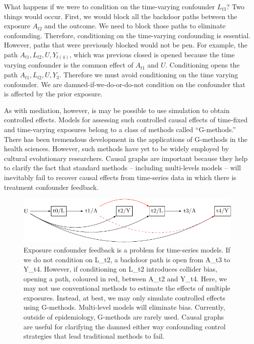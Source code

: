 \documentclass[
  singlecolumn]{report}
\begin{document}
What happens if we were to condition on the time-varying confounder
\(L_{t3}\)? Two things would occur. First, we would block all the
backdoor paths between the exposure \(A_{t2}\) and the outcome. We need
to block those paths to eliminate confounding. Therefore, conditioning
on the time-varying confounding is essential. However, paths that were
previously blocked would not be pen. For example, the path
\(A_{t1}, L_{t2}, U, Y_{t(4)}\), which was previous closed is opened
because the time varying confounder is the common effect of \(A_{t1}\)
and \(U\). Conditioning opens the path \(A_{t1}, L_{t2}, U, Y_{3}\).
Therefore we must avoid conditioning on the time varying confounder. We
are damned-if-we-do-or-do-not condition on the confounder that is
affected by the prior exposure.

As with mediation, however, is may be possible to use simulation to
obtain controlled effects. Models for assessing such controlled causal
effects of time-fixed and time-varying exposures belong to a class of
methods called ``G-methods.'' There has been tremendous development in
the applications of G-methods in the health sciences. However, such
methods have yet to be widely employed by cultural evolutionary
researchers. Causal graphs are important because they help to clarify
the fact that standard methods -- including multi-levels models -- will
inevitably fail to recover causal effects from time-series data in which
there is treatment confounder feedback.

\begin{figure}

{\centering \includegraphics[width=1\textwidth,height=\textheight]{causal-dags_files/figure-pdf/fig-dag-9-1.pdf}

}

\caption{\label{fig-dag-9}Exposure confounder feedback is a problem for
time-series models. If we do not condition on L\_t2, a backdoor path is
open from A\_t3 to Y\_t4. However, if conditioning on L\_t2 introduces
collider bias, opening a path, coloured in red, between A\_t2 and Y\_t4.
Here, we may not use conventional methods to estimate the effects of
multiple exposures. Instead, at best, we may only simulate controlled
effects using G-methods. Multi-level models will eliminate bias.
Currently, outside of epidemiology, G-methods are rarely used. Causal
graphs are useful for clarifying the damned either way confounding
control strategies that lead traditional methods to fail.}

\end{figure}
\end{document}
